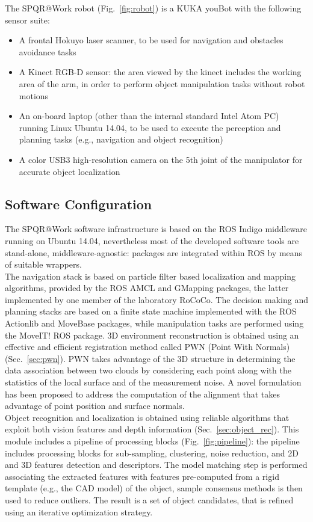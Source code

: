 \documentclass[conference]{IEEEtran}
\begin{document}
The SPQR@Work robot (Fig.~\ref{fig:robot}) is a KUKA youBot with the following sensor suite:

\begin{itemize}
 \item A frontal Hokuyo laser scanner, to be used for navigation and obstacles avoidance tasks
 \item A Kinect RGB-D sensor: the area viewed by the kinect includes the working area of the arm, in order to perform object manipulation tasks without robot motions
 \item An on-board laptop (other than the internal standard Intel Atom PC) running Linux Ubuntu 14.04, to be used to execute the perception and planning tasks (e.g., navigation and object recognition)
 \item A color USB3 high-resolution camera on the 5th joint of the manipulator for accurate object localization
\end{itemize}
 
\subsection{Software Configuration}

The SPQR@Work software infrastructure is based on the ROS Indigo middleware running on Ubuntu 14.04, nevertheless most of the developed software tools are stand-alone, middleware-agnostic: packages are integrated within ROS by means of suitable wrappers.\\
The navigation stack is based on particle filter based localization and mapping algorithms, provided by the ROS AMCL and GMapping packages, the latter implemented by one member of the laboratory RoCoCo. The decision making and planning stacks are based on a finite state machine implemented with the ROS Actionlib and MoveBase packages, while manipulation tasks are performed using the MoveIT! ROS package.
3D environment reconstruction is obtained using an effective and efficient registration method called PWN (Point With Normals) (Sec.~\ref{sec:pwn}). 
PWN takes advantage of the 3D structure in determining the data association between two clouds by considering each point along with the statistics of the local surface and of the measurement noise. A novel formulation has been proposed to address the computation of the alignment that takes advantage of point position and surface normals.\\

Object recognition and localization is obtained using reliable algorithms that exploit both vision features and depth information (Sec.~\ref{sec:object_rec}). This module includes a pipeline of processing blocks (Fig.~\ref{fig:pipeline}): the pipeline includes processing blocks for sub-sampling, clustering, noise reduction, and 2D and 3D features detection and descriptors. The model matching step is performed associating the extracted features with features pre-computed from a rigid template (e.g., the CAD model) of the object, sample consensus methods is then used to reduce outliers. The result is a set of object candidates, that is refined using an iterative optimization strategy. 
\end{document}

